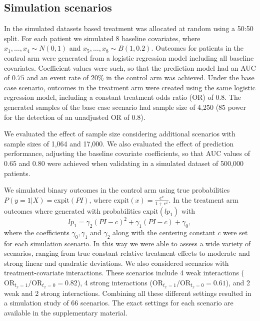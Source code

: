 \documentclass{article}
\begin{document}
\hypertarget{simulation-scenarios}{%
\subsection{Simulation scenarios}\label{simulation-scenarios}}

In the simulated datasets based treatment was allocated at random using
a 50:50 split. For each patient we simulated \(8\) baseline covariates,
where \(x_1,\dots,x_4\sim N(0, 1)\) and \(x_5,\dots,x_8\sim B(1, 0.2)\).
Outcomes for patients in the control arm were generated from a logistic
regression model including all baseline covariates. Coefficient values
were such, so that the prediction model had an AUC of \(0.75\) and an
event rate of \(20\%\) in the control arm was achieved. Under the base
case scenario, outcomes in the treatment arm were created using the same
logistic regression model, including a constant treatment odds ratio
(OR) of \(0.8\). The generated samples of the base case scenario had
sample size of 4,250 (\(85%
\) power for the detection of an unadjusted OR of \(0.8\)).

We evaluated the effect of sample size considering additional scenarios
with sample sizes of 1,064 and 17,000. We also evaluated the effect of
prediction performance, adjusting the baseline covariate coefficients,
so that AUC values of \(0.65\) and \(0.80\) were achieved when
validating in a simulated dataset of 500,000 patients.

We simulated binary outcomes in the control arm using true probabilities
\(P(y=1|X) = \text{expit}(PI)\), where
\(\text{expit}(x)= \frac{e^x}{1 + e^x}\). In the treatment arm outcomes
where generated with probabilities \(\text{expit}(lp_1)\) with
\[ lp_1 = \gamma_2(PI-c)^2 + \gamma_1(PI-c) + \gamma_0,\] where the
coefficients \(\gamma_0, \gamma_1\) and \(\gamma_2\) along with the
centering constant \(c\) were set for each simulation scenario. In this
way we were able to assess a wide variety of scenarios, ranging from
true constant relative treatment effects to moderate and strong linear
and quadratic deviations. We also considered scenarios with
treatment-covariate interactions. These scenarios include 4 weak
interactions (\(\text{OR}_{t_x=1} / \text{OR}_{t_x=0}=0.82\)), 4 strong
interactions (\(\text{OR}_{t_x=1} / \text{OR}_{t_x=0}=0.61\)), and 2
weak and 2 strong interactions. Combining all these different settings
resulted in a simulation study of \(66\) scenarios. The exact settings
for each scenario are available in the supplementary material.
\end{document}
